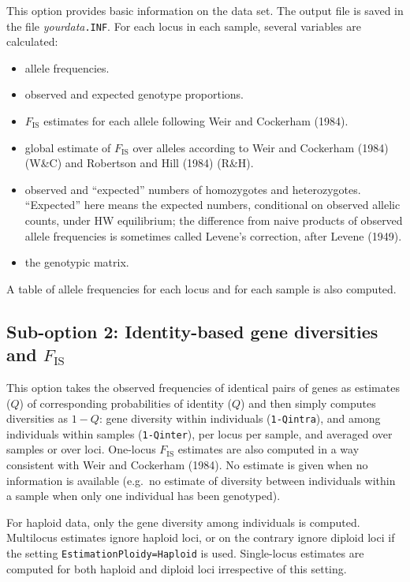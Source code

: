 \documentclass[12pt,]{book}
\theoremstyle{definition}
\theoremstyle{definition}
\theoremstyle{definition}
\theoremstyle{remark}
\begin{document}
This option provides basic information on the data set. The output file
is saved in the file \emph{yourdata}\texttt{.INF}. For each locus in
each sample, several variables are calculated:

\begin{itemize}
\item
  allele frequencies.
\item
  observed and expected genotype proportions.
\item
  \(F_\mathrm{IS}\) estimates for each allele following Weir and
  Cockerham (1984).
\item
  global estimate of \(F_\mathrm{IS}\) over alleles according to Weir
  and Cockerham (1984) (W\&C) and Robertson and Hill (1984) (R\&H).
\item
  observed and ``expected'' numbers of homozygotes and heterozygotes.
  ``Expected'' here means the expected numbers, conditional on observed
  allelic counts, under HW equilibrium; the difference from naive
  products of observed allele frequencies is sometimes called Levene's
  correction, after Levene (1949).
\item
  the genotypic matrix.
\end{itemize}

A table of allele frequencies for each locus and for each sample is also
computed.

\subsection{\texorpdfstring{Sub-option 2: Identity-based gene
diversities and
\(F_\mathrm{IS}\)}{Sub-option 2: Identity-based gene diversities and F\_\textbackslash{}mathrm\{IS\}}}\label{sub-option-2-identity-based-gene-diversities-and-f_mathrmis}

This option takes the observed frequencies of identical pairs of genes
as estimates (\(Q\)) of corresponding probabilities of identity (\(Q\))
and then simply computes diversities as \(1-Q\): gene diversity within
individuals (\texttt{1-Qintra}), and among individuals within samples
(\texttt{1-Qinter}), per locus per sample, and averaged over samples or
over loci. One-locus \(F_\mathrm{IS}\) estimates are also computed in a
way consistent with Weir and Cockerham (1984). No estimate is given when
no information is available (e.g.~no estimate of diversity between
individuals within a sample when only one individual has been
genotyped).

For haploid data, only the gene diversity among
individuals is computed. Multilocus estimates ignore haploid loci, or on
the contrary ignore diploid loci if the setting
\texttt{EstimationPloidy=Haploid} is used. Single-locus estimates are
computed for both haploid and diploid loci irrespective of this setting.
\end{document}

